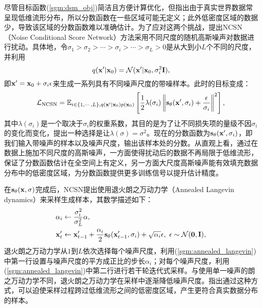 \documentclass[11pt,a4paper,UTF8]{ctexart}
\begin{document}
尽管目标函数(\ref{sgm:dsm_obj})简洁且方便计算优化，但\cite{song2019generative}指出由于真实世界数据常呈现低维流形分布，所以分数函数在一些区域可能无定义；此外低密度区域的数据少，导致该区域的分数函数难以准确估计。为了应对这两个挑战，\cite{song2019generative}提出NCSN（Noise Conditional Score Network）方法采用不同尺度的随机高斯噪声对数据进行扰动。具体地，令$\sigma_1 > \sigma_2 > \cdots > \sigma_i > \cdots > \sigma_L > 0$是从大到小$L$个不同的尺度，并利用
\begin{equation}
    q(\mathbf{x}^\prime|\mathbf{x}_0)=\mathcal{N}(\mathbf{x}^\prime|\mathbf{x}_0,\sigma_i^2\mathbf{I}),
\label{sgm:ncsn_forward}
\end{equation}
即$\mathbf{x}^\prime=\mathbf{x}_0+\sigma_i\epsilon$来生成一系列具有不同噪声尺度的带噪样本。此时的目标变成：
\begin{align}
\begin{split}
    \mathcal{L}_{\text{NCSN}}=\mathbb{E}_{i\in\{1,\cdots,L\},q(\mathbf{x}^\prime|\mathbf{x}_0)p(\mathbf{x}_0)} \left[\frac{1}{2} \lambda(\sigma_i)\left\| \mathbf{s}_\theta(\mathbf{x}^\prime,\sigma_i) + \frac{\epsilon}{\sigma_i} \right\|^2 \right],
\end{split}
\label{sgm:ncsn}
\end{align}
其中$\lambda(\sigma_i)$是一个取决于$\sigma_i$的权重系数，其目的是为了让不同损失项的量级不因$\sigma_i$的变化而变化，\cite{song2019generative}提出一种选择是让$\lambda(\sigma)=\sigma^2$。现在的分数函数为$\mathbf{s}_\theta(\mathbf{x}^\prime,\sigma_i)$，即我们输入带噪声的样本以及噪声尺度，输出该样本处的分数。从直观上看，通过在数据上施加不同尺度的高斯噪声，一方面使得扰动后的数据不再局限于低维流形，保证了分数函数估计在全空间上有定义，另一方面大尺度高斯噪声能有效填充数据分布中的低密度区域，为分数函数提供更多训练信号以提升估计精度。

在$\mathbf{s}_\theta(\mathbf{x},\sigma)$完成后，NCSN提出使用退火朗之万动力学（Annealed Langevin dynamics）来采样生成样本，其数学描述如下：
\begin{align}
\begin{split}
\alpha_i &\leftarrow \frac{\sigma_i^2}{\sigma_L^2}\alpha, \\
\mathbf{x}^\prime_t & \leftarrow\mathbf{x}^\prime_{t-1} + \frac{\alpha_i}{2}\mathbf{s}_{\theta}(\mathbf{x}^\prime_{t-1},\sigma_i) + \sqrt{\alpha_i}\epsilon,\ \epsilon\sim\mathcal{N}(\mathbf{0},\mathbf{I}),
\end{split}
\label{sgm:annealed_langevin}
\end{align}
退火朗之万动力学从$1$到$L$依次选择每个噪声尺度，利用(\ref{sgm:annealed_langevin})中第一行设置与噪声尺度的平方成正比的步长$\alpha_i$；对每个噪声尺度，利用(\ref{sgm:annealed_langevin})中第二行进行若干轮迭代式采样。与使用单一噪声的朗之万动力学不同，退火朗之万动力学在采样中逐渐降低噪声尺度。\cite{song2019generative}指出通过这种方式，可以迫使采样过程跨过低维流形之间的低密度区域，产生更符合真实数据分布的样本。
\end{document}

